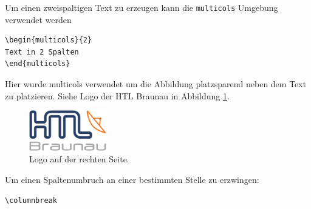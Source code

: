 \begin{multicols}{2}

Um einen zweispaltigen Text zu erzeugen kann die \verb+multicols+ Umgebung verwendet werden

\begin{Verbatim}[frame=single]
\begin{multicols}{2}
Text in 2 Spalten
\end{multicols}
\end{Verbatim}

Hier wurde multicols verwendet um die Abbildung platzsparend neben dem Text zu platzieren.
Siehe Logo der HTL Braunau in Abbildung \ref{logoTwoCols}.


\columnbreak
\begin{figure}[H]
	\centering
	\includegraphics[width=0.3\textwidth]{./media/images/htl_c_cmyk_rein.pdf}
  	\caption{Logo auf der rechten Seite.}
  	\label{logoTwoCols}
\end{figure}

Um einen Spaltenumbruch an einer bestimmten Stelle zu erzwingen:
\begin{Verbatim}[frame=single]
\columnbreak
\end{Verbatim}


\end{multicols}


